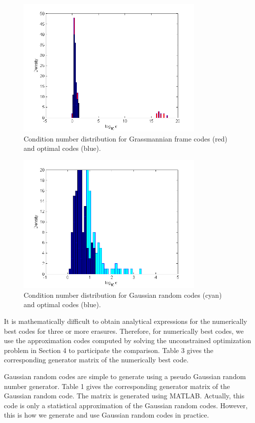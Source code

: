 \documentclass{sig-alternate}
\begin{document}
\begin{figure}
\centering
\includegraphics[width=3.6in]{grass_opt_b_120.png}
\caption{Condition number distribution for Grassmannian frame codes (red) and optimal codes (blue).}
\label{fig_sim}
\end{figure}

 
\begin{figure}
\centering
\includegraphics[width=3.6in]{rand_opt_b_120.png}
\caption{Condition number distribution for Gaussian random codes (cyan) and optimal codes (blue).}
\label{fig_sim}
\end{figure}


It is mathematically difficult to obtain analytical expressions for the numerically best codes
for three or more erasures. Therefore, for numerically best codes, we use the approximation 
codes computed by solving the unconstrained optimization problem 
in Section 4 to participate the comparison. 
Table 3 gives the corresponding generator matrix
of the numerically best code. 

Gaussian random codes are simple to generate using a pseudo Gaussian random number generator.
Table 1 gives the corresponding generator matrix of the Gaussian random code.
The matrix is generated using MATLAB.
Actually, this code is only a statistical approximation of the Gaussian random codes.
However, this is how we generate and use Gaussian random codes in practice.
\end{document}

